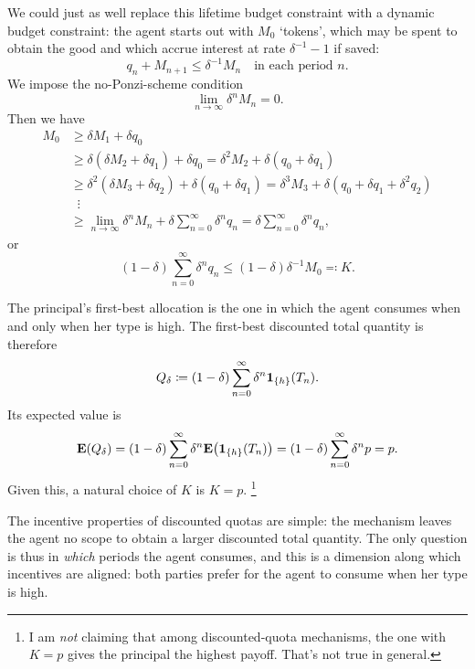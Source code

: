 We could just as well replace this lifetime budget constraint with a dynamic budget constraint: the agent starts out with $M_0$ `tokens',
which may be spent to obtain the good and which accrue interest at rate $\delta^{-1}-1$ if saved:
%
\begin{equation*}
	q_n + M_{n+1}
	\leq \delta^{-1} M_n 
	\quad \text{in each period $n$.}
\end{equation*}
%
We impose the no-Ponzi-scheme condition
%
\begin{equation*}
	\lim_{n \to \infty} \delta^n M_n = 0 .
\end{equation*}
%
Then we have
%
\begin{align*}
	M_0
	&\geq \delta M_1 + \delta q_0
	\\
	&\geq \delta ( \delta M_2 + \delta q_1 )
	+ \delta q_0
	= \delta^2 M_2
	+ \delta ( q_0 + \delta q_1 )
	\\
	&\geq \delta^2 ( \delta M_3 + \delta q_2 )
	+ \delta ( q_0 + \delta q_1 )
	= \delta^3 M_3
	+ \delta \left( q_0 + \delta q_1 + \delta^2 q_2 \right)
	\\
	&\;\; \vdots
	\\
	&\geq \lim_{n \to \infty} \delta^n M_n
	+ \delta \sum_{n=0}^\infty \delta^n q_n 
	= \delta \sum_{n=0}^\infty \delta^n q_n ,
\end{align*}
%
or
%
\begin{equation*}
	(1-\delta) \sum_{n=0}^\infty \delta^n q_n
	\leq (1-\delta) \delta^{-1} M_0
	\eqqcolon K.
\end{equation*}

The principal's first-best allocation
is the one in which the agent consumes when and only when her type is high.
The first-best discounted total quantity is therefore
%
\begin{equation*}
	Q_\delta \coloneqq (1-\delta) \sum_{n=0}^\infty \delta^n \boldsymbol{1}_{\{h\}}(T_n) .
\end{equation*}
%
Its expected value is
%
\begin{equation*}
	\E( Q_\delta )
	= (1-\delta) \sum_{n=0}^\infty \delta^n \E\left( \1_{\{h\}}(T_n) \right)
	= (1-\delta) \sum_{n=0}^\infty \delta^n p
	= p .
\end{equation*}
%
Given this, a natural choice of $K$ is $K = p$.%
	\footnote{I am \emph{not} claiming that among discounted-quota mechanisms, the one with $K=p$ gives the principal the highest payoff. That's not true in general.}

The incentive properties of discounted quotas are simple:
the mechanism leaves the agent no scope to obtain a larger discounted total quantity.
The only question is thus in \emph{which} periods the agent consumes,
and this is a dimension along which incentives are aligned:
both parties prefer for the agent to consume when her type is high.

